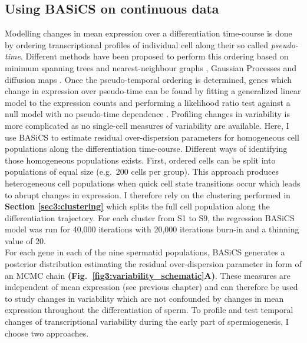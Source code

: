 \subsection{Using BASiCS on continuous data}

Modelling changes in mean expression over a differentiation time-course is done by ordering transcriptional profiles of individual cell along their so called \emph{pseudo-time}. Different methods have been proposed to perform this ordering based on minimum spanning trees \citep{Trapnell2014} and nearest-neighbour graphs \cite{Setty2016}, Gaussian Processes \citep{Reid2016a, Campbell2016b} and diffusion maps \citep{Haghverdi2016}. Once the pseudo-temporal ordering is determined, genes which change in expression over pseudo-time can be found by fitting a generalized linear model to the expression counts and performing a likelihood ratio test against a null model with no pseudo-time dependence \citep{Trapnell2014}. Profiling changes in variability is more complicated as no single-cell measures of variability are available. Here, I use BASiCS to estimate residual over-dispersion parameters for homogeneous cell populations along the differentiation time-course. Different ways of identifying those homogeneous populations exists. First, ordered cells can be split into populations of equal size (e.g.~200 cells per group). This approach produces heterogeneous cell populations when quick cell state transitions occur which leads to abrupt changes in expression. I therefore rely on the clustering performed in \textbf{Section \ref{sec3:clustering}} which splits the full cell population along the differentiation trajectory. For each cluster from S1 to S9, the regression BASiCS model was run for 40,000 iterations with 20,000 iterations burn-in and a thinning value of 20. \\

For each gene in each of the nine spermatid populations, BASiCS generates a posterior distribution estimating the residual over-dispersion parameter in form of an MCMC chain \textbf{(Fig.~\ref{fig3:variability_schematic}A)}. These measures are independent of mean expression (see previous chapter) and can therefore be used to study changes in variability which are not confounded by changes in mean expression throughout the differentiation of sperm. To profile and test temporal changes of transcriptional variability during the early part of spermiogenesis, I choose two approaches. \\

